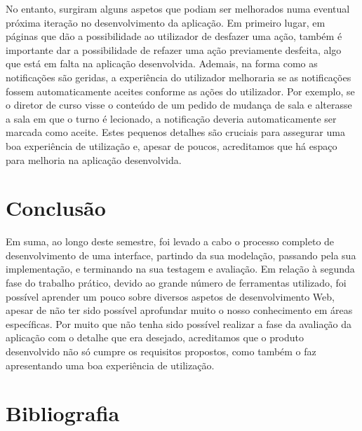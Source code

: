 \documentclass[12pt, a4paper]{article}
\begin{document}
No entanto, surgiram alguns aspetos que podiam ser melhorados numa eventual próxima iteração no
desenvolvimento da aplicação. Em primeiro lugar, em páginas que dão a possibilidade ao utilizador de
desfazer uma ação, também é importante dar a possibilidade de refazer uma ação previamente desfeita,
algo que está em falta na aplicação desenvolvida. Ademais, na forma como as notificações são
geridas, a experiência do utilizador melhoraria se as notificações fossem automaticamente aceites
conforme as ações do utilizador. Por exemplo, se o diretor de curso visse o conteúdo de um pedido de
mudança de sala e alterasse a sala em que o turno é lecionado, a notificação deveria automaticamente
ser marcada como aceite. Estes pequenos detalhes são cruciais para assegurar uma boa experiência
de utilização e, apesar de poucos, acreditamos que há espaço para melhoria na aplicação
desenvolvida.

\section{Conclusão}

Em suma, ao longo deste semestre, foi levado a cabo o processo completo de desenvolvimento de uma
interface, partindo da sua modelação, passando pela sua implementação, e terminando na sua testagem
e avaliação. Em relação à segunda fase do trabalho prático, devido ao grande número de ferramentas
utilizado, foi possível aprender um pouco sobre diversos aspetos de desenvolvimento Web, apesar de
não ter sido possível aprofundar muito o nosso conhecimento em áreas específicas. Por muito que não
tenha sido possível realizar a fase da avaliação da aplicação com o detalhe que era desejado,
acreditamos que o produto desenvolvido não só cumpre os requisitos propostos, como também o faz
apresentando uma boa experiência de utilização.

\begingroup
\section{Bibliografia}
\renewcommand{\section}[2]{}
\end{document}
